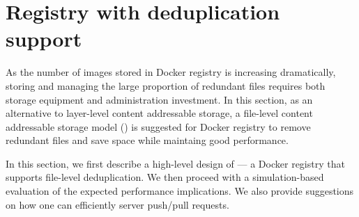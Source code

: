 \section{Registry with deduplication support}
\label{sec:file_adressable}

%
As the number of images stored in Docker registry is increasing dramatically,
storing and managing the large proportion of redundant files requires both
storage equipment and administration investment. 
In this section, as an
alternative to layer-level content addressable storage, a file-level content
addressable storage model (\sysname) is suggested for Docker registry to remove
redundant files and save space while maintaing good performance.  

In this section, we first describe a high-level design of \emph{\sysname}---
a Docker registry that supports file-level deduplication.
We then proceed with a simulation-based evaluation of the expected performance
implications.
We also provide suggestions on how one can efficiently server push/pull requests.






